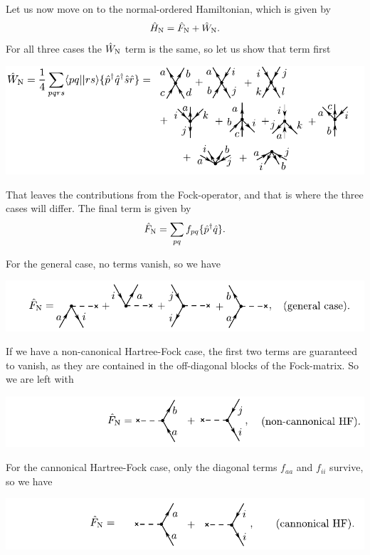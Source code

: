 \documentclass[a4paper, 11pt, notitlepage, english]{article}
\newcommand{\op}[1]{\hat{#1}}
\begin{document}
\clearpage

Let us now move on to the normal-ordered Hamiltonian, which is given by
$$\op{H}_{\rm N} = \op{F}_{\rm N} + \op{W}_{\rm N}.$$
For all three cases the $\op{W}_{\rm N}$ term is the same, so let us show that term first

\begin{centering}
\includegraphics[width=\textwidth]{project2_4b}
\end{centering}That leaves the contributions from the Fock-operator, and that is where the 
three cases will differ. The final term is given by
$$\op{F}_{\rm N} = \sum_{pq} f_{pq} \{\op{p}^\dagger \op{q}\}.$$

For the general case, no terms vanish, so we have

\begin{centering}
\includegraphics[width=\textwidth]{project2_4c}
\end{centering}

If we have a non-canonical Hartree-Fock case, the first two terms are guaranteed to vanish, as they are contained in the off-diagonal blocks of the Fock-matrix. So we are left with

\begin{centering}
\includegraphics[width=\textwidth]{project2_4d}
\end{centering}

For the cannonical Hartree-Fock case, only the diagonal terms $f_{aa}$ and $f_{ii}$ survive, so we have


\begin{centering}
\includegraphics[width=\textwidth]{project2_4e}
\end{centering}
\end{document}
